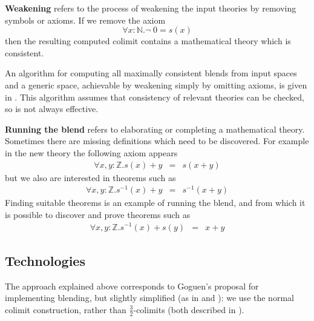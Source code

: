 {\bf Weakening} refers to the process of weakening the input
theories by removing symbols or axioms. If we remove the axiom 
$$
\forall x: \mathbb{N}. \neg\; 0 = s(x)
$$
then the resulting computed colimit contains a mathematical theory
which is consistent.  

An algorithm for computing all maximally consistent blends from input
spaces and a generic space, achievable by weakening simply by omitting
axioms, is given in \textcite{MartinezEtAl14}. This algorithm assumes
that consistency of relevant theories can be checked, so is not always
effective.

{\bf Running the blend} refers to elaborating or completing a
mathematical theory. Sometimes there are missing definitions which
need to be discovered. For example in the new theory 
the following axiom appears
\begin{eqnarray*}
\forall x,y:\mathbb{Z}. s(x) + y &=& s(x+y)
\end{eqnarray*}
but we also are interested in theorems such as
\begin{eqnarray*}
\forall x,y:\mathbb{Z}. s^{-1}(x) + y &=& s^{-1}(x+y)
\end{eqnarray*}
Finding suitable theorems is an example of running the blend, and from which it
is possible to discover and prove 
theorems such as
\begin{eqnarray*}
\forall x,y:\mathbb{Z}. s^{-1}(x) + s(y) &=& x+y
\end{eqnarray*}

\subsection{Technologies}

The approach explained above corresponds to Goguen's
proposal \parencite{Gog99} for implementing blending, but slightly
simplified (as in \textcite{Kutz2012} and \textcite{KuMoNeCo14}): we use
the normal colimit construction, rather than $\frac{3}{2}$-colimits
(both described in \textcite{Gog99}).


